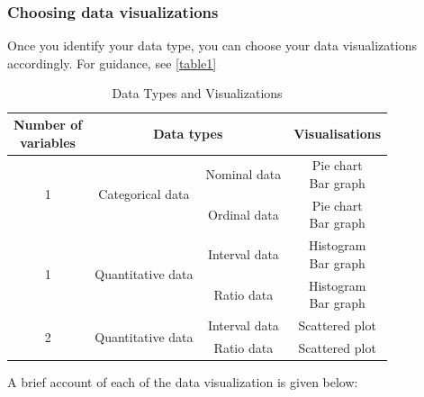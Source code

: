 \documentclass[a4paper, 11pt]{article}
\begin{document}
\subsubsection{Choosing data visualizations}
%
	Once you identify your data type, you can choose your data visualizations accordingly. For guidance, see \vref{table1}
	\begin{table}[h!]
		\def\arraystretch{1.25}
		\centering
		\begin{tabular}{|*{4}{c|}}
			\hline\hline
			\makecell[c]{\textbf{Number of}\\\textbf{variables}}	&	\multicolumn{2}{c|}{\textbf{Data types}}	&	\textbf{Visualisations}\\
			\hline\hline
			\multirow{2}{0.5in}{1}	&	\multirow{2}{1.5in}{Categorical data}	&	Nominal data	&	\makecell[c]{Pie chart\\Bar graph}\\
			\cline{3-4}
			&	&	Ordinal data	&	\makecell[c]{Pie chart\\Bar graph}\\
			\hline
			\multirow{2}{0.5in}{1}	&	\multirow{2}{1.5in}{Quantitative data}	&	Interval data	&	\makecell[c]{Histogram\\Bar graph}\\
			\cline{3-4}
			&	&	Ratio data	&	\makecell[c]{Histogram\\Bar graph}\\
			\hline
			\multirow{2}{0.5in}{2}	&	\multirow{2}{1.5in}{Quantitative data}	&	Interval data	&	Scattered plot\\
			\cline{3-4}
			&	&	Ratio data	&	Scattered plot\\
			\hline
		\end{tabular}
		\caption{Data Types and Visualizations}
		\label{table1}
	\end{table}
%
	A brief account of each of the data visualization is given below:
%
\end{document}
